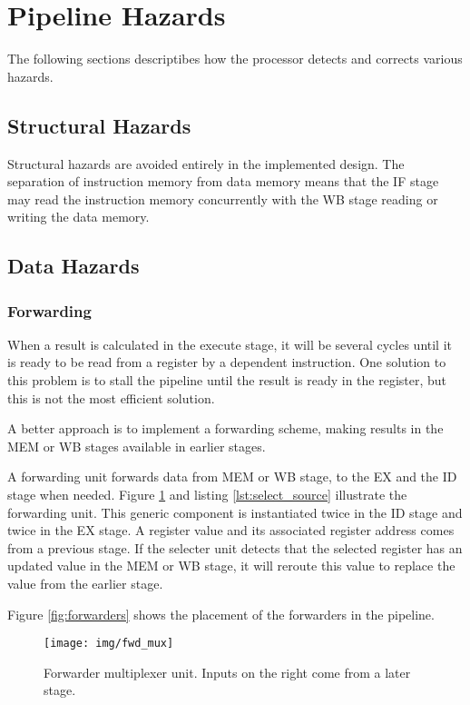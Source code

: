 \section{Pipeline Hazards}
The following sections descriptibes how the processor detects and corrects various hazards.

\subsection{Structural Hazards}
Structural hazards are avoided entirely in the implemented design.
The separation of instruction memory from data memory means that the IF stage may read the instruction memory concurrently with the WB stage reading or writing the data memory.

\subsection{Data Hazards}
\label{sec:data-hazards}
\subsubsection{Forwarding}
When a result is calculated in the execute stage,
it will be several cycles until it is ready to be read from a register by a dependent instruction.
One solution to this problem is to stall the pipeline until the result is ready in the register,
but this is not the most efficient solution.

A better approach is to implement a forwarding scheme,
making results in the MEM or WB stages available in earlier stages.

A forwarding unit forwards data from MEM or WB stage, to the EX and the ID stage when needed.
Figure \ref{fig:fwd_mux} and listing \ref{lst:select_source} illustrate the forwarding unit.
This generic component is instantiated twice in the ID stage and twice in the EX stage.
A register value and its associated register address comes from a previous stage.
If the selecter unit detects that the selected register has an updated value in the MEM or WB stage,
it will reroute this value to replace the value from the earlier stage.

Figure \ref{fig:forwarders} shows the placement of the forwarders in the pipeline.

\begin{figure}[h]
    \centering
    \texttt{[image: img/fwd\_mux]}
    \caption{Forwarder multiplexer unit. Inputs on the right come from a later stage.}
    \label{fig:fwd_mux}
\end{figure}

